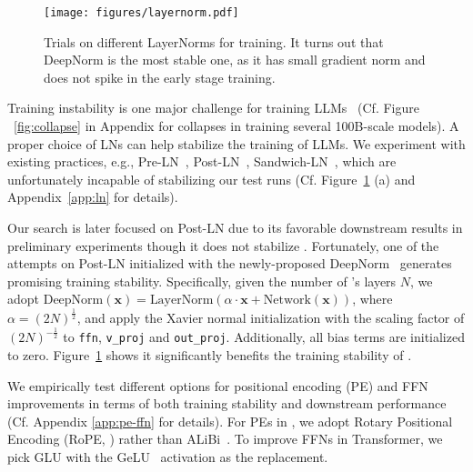 \begin{figure}[t]
    \centering
    \texttt{[image: figures/layernorm.pdf]}
    \vspace{-2mm}
    \caption{Trials on different LayerNorms for \glm training. It turns out that DeepNorm is the most stable one, as it has small gradient norm and does not spike in the early stage training.}
    \vspace{-6mm}
    \label{fig:layernorm}
\end{figure}

Training instability is one major challenge for training LLMs~\citep{zhang2022opt,scao2022what,chowdhery2022palm} (Cf. Figure ~\ref{fig:collapse} in Appendix for  collapses in training several 100B-scale models). 
A proper choice of LNs can help stabilize the training of LLMs. %
We experiment with existing practices, e.g., Pre-LN~\citep{xiong2020layer}, Post-LN~\citep{ba2016layer}, %
Sandwich-LN~\citep{ding2021cogview}, which are unfortunately incapable of stabilizing our \glm test runs (Cf. Figure~\ref{fig:layernorm} (a) and Appendix~\ref{app:ln} for details). 

Our search is later focused on Post-LN due to its favorable downstream results in preliminary experiments though it does not stabilize \glm. 
Fortunately, one of the attempts on Post-LN initialized with the newly-proposed DeepNorm~\citep{wang2022deepnet} generates promising training stability. 
Specifically, given the number of \glm's layers $N$, 
    we adopt $\textrm{DeepNorm}(\boldsymbol{x}) = \textrm{LayerNorm}(\alpha\cdot \boldsymbol{x} + \textrm{Network}(\boldsymbol{x}))$, where $\alpha=(2N)^\frac{1}{2}$, 
    and 
   apply the Xavier normal initialization with the scaling factor of $(2N)^{-\frac{1}{2}}$ to \texttt{ffn}, \texttt{v\_proj} and \texttt{out\_proj}. Additionally, all bias terms are initialized to zero.
Figure~\ref{fig:layernorm} shows it significantly benefits the training stability of \glm. 

We empirically test different options for positional encoding (PE) and FFN improvements in terms of both training stability and downstream performance (Cf. Appendix \ref{app:pe-ffn} for details).  
For PEs in \glm, we adopt Rotary Positional Encoding (RoPE, \cite{su2021roformer}) rather than  ALiBi~\citep{press2021train}. 
To improve FFNs in Transformer, we pick GLU with the GeLU~\citep{hendrycks2016gaussian} activation as the replacement.

